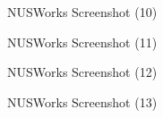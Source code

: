 \documentclass[fyp]{socreport}
\begin{document}
\begin{figure}
\caption{NUSWorks Screenshot (10)}
\label{screen-10}
\end{figure}

\begin{figure}
\caption{NUSWorks Screenshot (11)}
\label{screen-11}
\end{figure}

\begin{figure}
\caption{NUSWorks Screenshot (12)}
\label{screen-12}
\end{figure}

\begin{figure}
\caption{NUSWorks Screenshot (13)}
\label{screen-13}
\end{figure}
\end{document}
